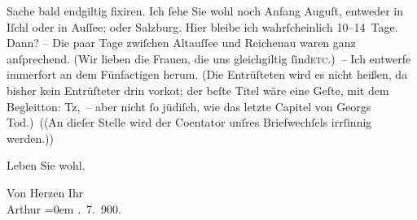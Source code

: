               Sache bald {\pb}endgiltig fixiren. Ich ſehe Sie wohl noch
               Anfang Auguſt, entweder in Iſchl oder in Auſſee; oder Salzburg. Hier bleibe ich wahrſcheinlich 10–14 Tage. Dann? – Die paar Tage
               zwiſchen Altauſſee und Reichenau waren ganz anſprechend. (Wir lieben die Frauen, die uns gleichgiltig
                  ſind\textsc{etc}.) – Ich entwerfe {\pb}immerfort an dem Fünfactigen
               herum. (Die Entrüſteten wird
               es nicht heißen, da bisher kein Entrüſteter drin vorko{\geminationm}t; der beſte Titel wäre eine Geſte, mit dem Begleitton: Tz, – aber nicht ſo
               jüdiſch, wie das letzte Capitel von Georgs
               Tod.) ((An dieſer Stelle wird der Co{\geminationm}entator unſres
               Briefwechſels irrſinnig werden.))\pend
           
\pstart
           {\pb}Leben Sie wohl.\pend
           
\pstart
           Von Herzen Ihr{\\[\baselineskip]}\spacefill\mbox{Arthur}\pend
           \leftskip=0em{}
. 7. 900.\pend
           \endnumbering{}  
      